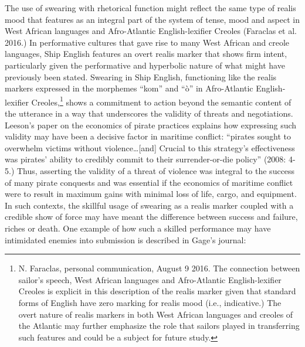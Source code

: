\documentclass[12pt]{article}
\newenvironment{styleStandard}{\renewcommand\baselinestretch{1.0}\setlength\leftskip{0cm}\setlength\rightskip{0cm plus 1fil}\setlength\parindent{0cm}\setlength\parfillskip{0pt plus 1fil}\setlength\parskip{0in plus 1pt}\writerlistparindent\writerlistleftskip\leavevmode\normalfont\normalsize\writerlistlabel\ignorespaces}{\unskip\vspace{0in plus 1pt}\par}
\newcommand\writerlistleftskip{}
\newcommand\writerlistparindent{}
\newcommand\writerlistlabel{}
\begin{document}
\begin{styleStandard}
The use of swearing with rhetorical function might reflect the same type of realis mood that features as an integral part of the system of tense, mood and aspect in West African languages and Afro-Atlantic English-lexifier Creoles (Faraclas et al. 2016.) In performative cultures that gave rise to many West African and creole languages, Ship English features an overt realis marker that shows firm intent, particularly given the performative and hyperbolic nature of what might have previously been stated. Swearing in Ship English, functioning like the realis markers expressed in the morphemes “kom” and “ò” in Afro-Atlantic English-lexifier Creoles,\footnote{ N. Faraclas, personal communication, August 9 2016. The connection between sailor’s speech, West African languages and Afro-Atlantic English-lexifier Creoles is explicit in this description of the realis marker given that standard forms of English have zero marking for realis mood (i.e., indicative.) The overt nature of realis markers in both West African languages and creoles of the Atlantic may further emphasize the role that sailors played in transferring such features and could be a subject for future study.} shows a commitment to action beyond the semantic content of the utterance in a way that underscores the validity of threats and negotiations. Leeson’s paper on the economics of pirate practices explains how expressing such validity may have been a decisive factor in maritime conflict: “pirates sought to overwhelm victims without violence…[and] Crucial to this strategy’s effectiveness was pirates’ ability to credibly commit to their surrender-or-die policy” (2008: 4-5.) Thus, asserting the validity of a threat of violence was integral to the success of many pirate conquests and was essential if the economics of maritime conflict were to result in maximum gains with minimal loss of life, cargo, and equipment. In such contexts, the skillful usage of swearing as a realis marker coupled with a credible show of force may have meant the difference between success and failure, riches or death. One example of how such a skilled performance may have intimidated enemies into submission is described in Gage’s journal:
\end{styleStandard}
\end{document}
